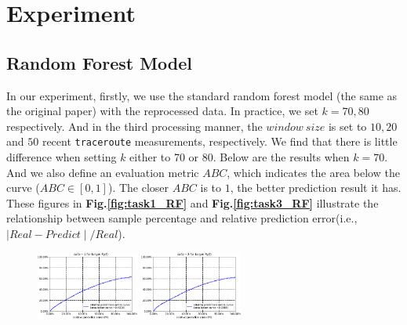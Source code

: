 \documentclass[sigconf]{acmart}
\begin{document}
	
	
	\section{Experiment}
	\subsection{Random Forest Model}
	In our experiment, firstly, we use the standard random forest model (the same as the original paper) with the reprocessed data.  In practice, we set $k = 70, 80$ respectively. And in the third processing manner, the $window\ size$ is set to $10,20$ and $50$ recent \texttt{traceroute} measurements, respectively. We find that there is little difference when setting $k$ either to 70 or 80. Below are the results when $k = 70$. And we also define an evaluation metric $ABC$, which indicates the  area below the curve ($ABC\in[0,1]$). The closer $ABC$ is to $1$, the better prediction result it has. These figures in \textbf{Fig.\ref{fig:task1_RF}} and \textbf{Fig.\ref{fig:task3_RF}} illustrate the relationship between sample percentage and relative prediction error(i.e., $\mid Real - Predict\mid/ Real $). 
	\begin{figure} [!htb] 
		\centering  
		\includegraphics[width=0.3\textwidth]{fig4/data-1-task-1-7030-RF.pdf}  
		\includegraphics[width=0.3\textwidth]{fig4/data-2-task-1-7030-RF.pdf} 
	\end{figure} 
\end{document}

